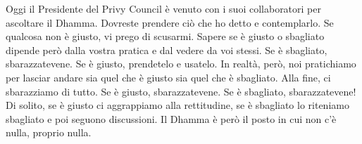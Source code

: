 Oggi il Presidente del Privy Council è venuto con i suoi collaboratori
per ascoltare il Dhamma. Dovreste prendere ciò che ho detto e
contemplarlo. Se qualcosa non è giusto, vi prego di scusarmi. Sapere se
è giusto o sbagliato dipende però dalla vostra pratica e dal vedere da
voi stessi. Se è sbagliato, sbarazzatevene. Se è giusto, prendetelo e
usatelo. In realtà, però, noi pratichiamo per lasciar andare sia quel
che è giusto sia quel che è sbagliato. Alla fine, ci sbarazziamo di
tutto. Se è giusto, sbarazzatevene. Se è sbagliato, sbarazzatevene! Di
solito, se è giusto ci aggrappiamo alla rettitudine, se è sbagliato lo
riteniamo sbagliato e poi seguono discussioni. Il Dhamma è però il posto
in cui non c'è nulla, proprio nulla.

